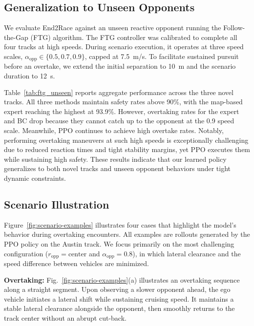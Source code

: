 \documentclass[letterpaper,10 pt,conference]{ieeeconf}
\begin{document}
\subsection{Generalization to Unseen Opponents}
\label{sec:reactive_opponents}

We evaluate End2Race against an unseen reactive opponent running the Follow-the-Gap (FTG) algorithm. The FTG controller was calibrated to complete all four tracks at high speeds. During scenario execution, it operates at three speed scales, $\alpha_{\mathrm{opp}} \in \{0.5, 0.7, 0.9\}$, capped at 7.5~m/s. To facilitate sustained pursuit before an overtake, we extend the initial separation to 10~m and the scenario duration to 12~s.

Table~\ref{tab:ftg_unseen} reports aggregate performance across the three novel tracks. All three methods maintain safety rates above 90\%, with the map-based expert reaching the highest at 93.9\%. However, overtaking rates for the expert and BC drop because they cannot catch up to the opponent at the 0.9 speed scale. Meanwhile, PPO continues to achieve high overtake rates. Notably, performing overtaking maneuvers at such high speeds is exceptionally challenging due to reduced reaction times and tight stability margins, yet PPO executes them while sustaining high safety. These results indicate that our learned policy generalizes to both novel tracks and unseen opponent behaviors under tight dynamic constraints.

\subsection{Scenario Illustration}

Figure~\ref{fig:scenario-examples} illustrates four cases that highlight the model's behavior during overtaking encounters. All examples are rollouts generated by the PPO policy on the Austin track. We focus primarily on the most challenging configuration ($r_{\mathrm{opp}}=\text{center}$ and $\alpha_{\mathrm{opp}}=0.8$), in which lateral clearance and the speed difference between vehicles are minimized.

\textbf{Overtaking:} Fig.~\ref{fig:scenario-examples}(a) illustrates an overtaking sequence along a straight segment. Upon observing a slower opponent ahead, the ego vehicle initiates a lateral shift while sustaining cruising speed. It maintains a stable lateral clearance alongside the opponent, then smoothly returns to the track center without an abrupt cut-back.
\end{document}
